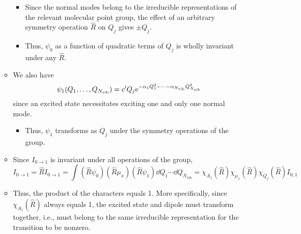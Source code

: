 \documentclass[../notes.tex]{subfiles}
\begin{document}
\begin{itemize}
\begin{itemize}
\begin{itemize}
            \item Since the normal modes belong to the irreducible representations of the relevant molecular point group, the effect of an arbitrary symmetry operation $\hat{R}$ on $Q_j$ gives $\pm Q_j$.
            \item Thus, $\psi_0$ as a function of quadratic terms of $Q_j$ is wholly invariant under any $\hat{R}$.
        \end{itemize}
        \item We also have
        \begin{equation*}
            \psi_1(Q_1,\dots,Q_{N_\text{vib}}) = c'Q_j\e[-\alpha_1Q_1^2-\cdots-\alpha_{N_\text{vib}}Q_{N_\text{vib}}^2]
        \end{equation*}
        since an excited state necessitates exciting one and only one normal mode.
        \begin{itemize}
            \item Thus, $\psi_1$ transforms as $Q_j$ under the symmetry operations of the group.
        \end{itemize}
        \item Since $I_{0\to 1}$ is invariant under all operations of the group,
        \begin{equation*}
            I_{0\to 1} = \hat{R}I_{0\to 1} = \int(\hat{R}\psi_0)(\hat{R}\mu_x)(\hat{R}\psi_1)\dd{Q_1}\cdots\dd{Q_{N_\text{vib}}} = \chi_{A_1}(\hat{R})\chi_{\mu_x}(\hat{R})\chi_{Q_j}(\hat{R})I_{0,1}
        \end{equation*}
        \item Thus, the product of the characters equals 1. More specifically, since $\chi_{A_1}(\hat{R})$ always equals 1, the excited state and dipole must transform together, i.e., must belong to the same irreducible representation for the transition to be nonzero.
    \end{itemize}
\end{itemize}
\end{document}
